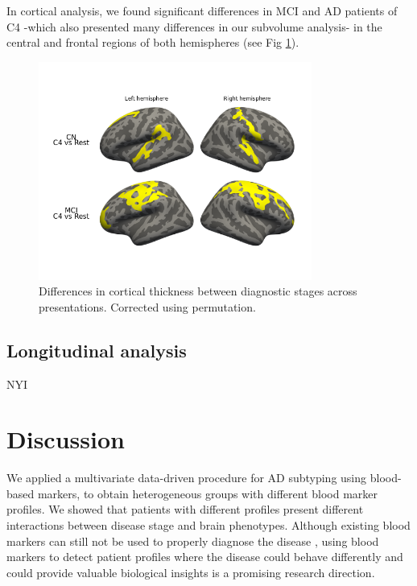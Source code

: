In cortical analysis, we found significant differences in MCI and AD patients of C4 -which also presented many differences in our subvolume analysis- in the central and frontal regions of both hemispheres (see Fig \ref{dxcluster_againstrest_cort}).

\begin{figure}[!htbp]
\centering
\includegraphics[width=0.8\textwidth]{figures/cimlr/ex4_cort.png}
\caption[Diagnostic interaction analysis, cortical thickness.]{Differences in cortical thickness between diagnostic stages across presentations. Corrected using permutation.}
\label{dxcluster_againstrest_cort}
\end{figure}

\subsection{Longitudinal analysis}
NYI 

\section{Discussion}
\label{conclusions}


We applied a multivariate data-driven procedure for AD subtyping using blood-based markers, to obtain heterogeneous groups with different blood marker profiles. We showed that patients with different profiles present different interactions between disease stage and brain phenotypes. Although existing blood markers can still not be used to properly diagnose the disease \cite{Schneider2009,Gupta2016,Lovheim2017}, using blood markers to detect patient profiles where the disease could behave differently and could provide valuable biological insights is a promising research direction. \\

